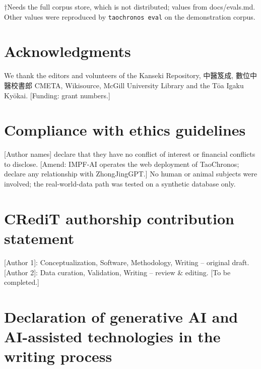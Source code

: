 \documentclass[
]{article}
\begin{document}
†Needs the full corpus store, which is not distributed; values from
docs/evals.md. Other values were reproduced by \texttt{taochronos\ eval}
on the demonstration corpus.

\hypertarget{acknowledgments}{%
\section*{Acknowledgments}\label{acknowledgments}}

We thank the editors and volunteers of the Kanseki Repository, 中醫笈成,
數位中醫校書郎 CMETA, Wikisource, McGill University Library and the Tōa
Igaku Kyōkai. {[}Funding: grant numbers.{]}

\hypertarget{compliance-with-ethics-guidelines}{%
\section*{Compliance with ethics
guidelines}\label{compliance-with-ethics-guidelines}}

{[}Author names{]} declare that they have no conflict of interest or
financial conflicts to disclose. {[}Amend: IMPF-AI operates the web
deployment of TaoChronos; declare any relationship with ZhongJingGPT.{]}
No human or animal subjects were involved; the real-world-data path was
tested on a synthetic database only.

\hypertarget{credit-authorship-contribution-statement}{%
\section*{CRediT authorship contribution
statement}\label{credit-authorship-contribution-statement}}

{[}Author 1{]}: Conceptualization, Software, Methodology, Writing --
original draft. {[}Author 2{]}: Data curation, Validation, Writing --
review \& editing. {[}To be completed.{]}

\hypertarget{declaration-of-generative-ai-and-ai-assisted-technologies-in-the-writing-process}{%
\section*{Declaration of generative AI and AI-assisted technologies in
the writing
process}\label{declaration-of-generative-ai-and-ai-assisted-technologies-in-the-writing-process}}
\end{document}
